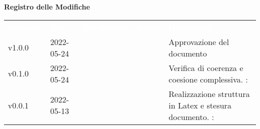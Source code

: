 

{\LARGE{\textbf{Registro delle Modifiche}}} \\
\begin{table}[!htbp]
	\renewcommand{\arraystretch}{1.5}
	\begin{tabular}{ m{}<{\centering}  m{}<{\centering}  m{}<{\centering}  m{}<{\centering}  m{}<{\centering} }
		\rowcolor{darkblue}
		\textcolor{white}{\textbf{Versione}} & \textcolor{white}{\textbf{Data}} & \textcolor{white}{\textbf{Nominativo}} & \textcolor{white}{\textbf{Ruolo}} & \textcolor{white}{\textbf{Descrizione}}                              \\
		v1.0.0                               & 2022-05-24                     & \FP                                       & \RE                               & Approvazione del documento                                           \\

		v0.1.0                               & 2022-05-24                      & \GC                                    & \AN                               & Verifica di coerenza e coesione complessiva. \VE: \textit{\PV}          \\

		v0.0.1                               & 2022-05-13                       & \GC                                    & \AN                               & Realizzazione struttura in Latex e stesura documento. \VE: \textit{\PV} \\
	\end{tabular}
\end{table}

\pagebreak